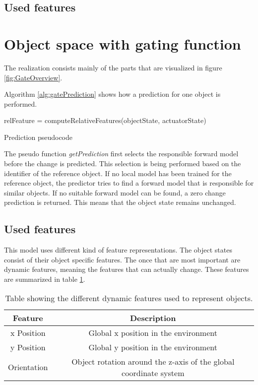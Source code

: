 \subsection{Used features \label{sec:intFeatures}}



\section{Object space with gating function \label{sec:gateRealization}}

The realization consists mainly of the parts that are visualized in figure \ref{fig:GateOverview}. 

Algorithm \ref{alg:gatePrediction} shows how a prediction for one object is performed. 


\begin{algorithm}
	\BlankLine
	relFeature = computeRelativeFeatures(objectState, actuatorState)\\
	\caption{Prediction pseudocode}
	\label{alg:gatePrediction}
\end{algorithm}

The pseudo function \textit{getPrediction} first selects the responsible forward model before the change is predicted. This selection is being performed based on the identifier of the reference object. If no local model has been trained for the reference object, the predictor tries to find a forward model that is responsible for similar objects. If no suitable forward model can be found, a zero change prediction is returned. This means that the object state remains unchanged.


\subsection{Used features}

This model uses different kind of feature representations. The object states consist of their object specific features. The once that are most important are dynamic features, meaning the features that can actually change. These features are summarized in table \ref{tab:gateObjectFeatures}.

\begin{table}
	\centering
	\begin{tabular}{|c|c|}
		\hline Feature & Description \\ 
		\hline x Position & Global x position in the environment \\ 
		\hline y Position & Global y position in the environment \\ 
		\hline Orientation & Object rotation around the z-axis of the global coordinate system \\ 
		\hline 
	\end{tabular} 
	\caption{Table showing the different dynamic features used to represent objects.}
	\label{tab:gateObjectFeatures}
\end{table}

